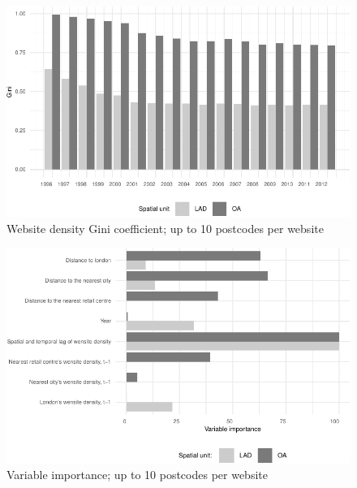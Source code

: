 \documentclass[
  authoryear,
  preprint,
  3p]{elsarticle}
\begin{document}
\begin{figure}[H]

{\centering \includegraphics[width=1\textwidth,height=\textheight]{anonymised_files/figure-pdf/gini10-1.pdf}

}

\caption{\label{gini10}Website density Gini coefficient; up to 10
postcodes per website}

\end{figure}%

\begin{figure}[H]

{\centering \includegraphics[width=1\textwidth,height=0.6\textheight]{anonymised_files/figure-pdf/varimp10-1.pdf}

}

\caption{\label{var.imp10}Variable importance; up to 10 postcodes per
website}

\end{figure}%
\end{document}
